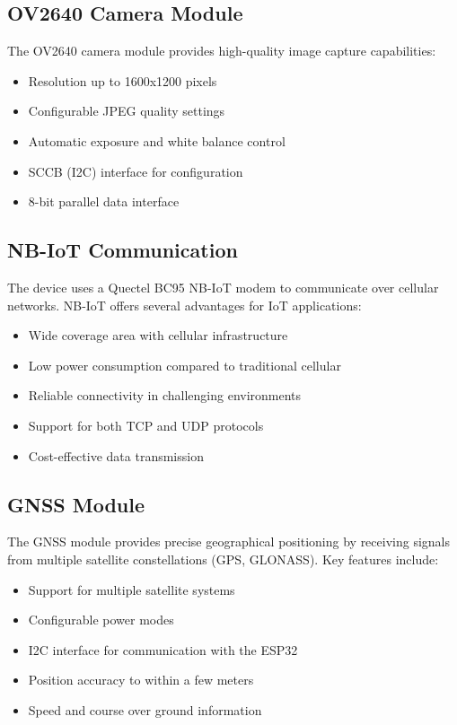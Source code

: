 \documentclass[11pt,a4paper]{article}
\begin{document}
\subsection{OV2640 Camera Module}

The OV2640 camera module provides high-quality image capture capabilities:

\begin{itemize}
    \item Resolution up to 1600x1200 pixels
    \item Configurable JPEG quality settings
    \item Automatic exposure and white balance control
    \item SCCB (I2C) interface for configuration
    \item 8-bit parallel data interface
\end{itemize}

\subsection{NB-IoT Communication}

The device uses a Quectel BC95 NB-IoT modem to communicate over cellular networks. NB-IoT offers several advantages for IoT applications:

\begin{itemize}
    \item Wide coverage area with cellular infrastructure
    \item Low power consumption compared to traditional cellular
    \item Reliable connectivity in challenging environments
    \item Support for both TCP and UDP protocols
    \item Cost-effective data transmission
\end{itemize}

\subsection{GNSS Module}

The GNSS module provides precise geographical positioning by receiving signals from multiple satellite constellations (GPS, GLONASS). Key features include:

\begin{itemize}
    \item Support for multiple satellite systems
    \item Configurable power modes
    \item I2C interface for communication with the ESP32
    \item Position accuracy to within a few meters
    \item Speed and course over ground information
\end{itemize}
\end{document}
